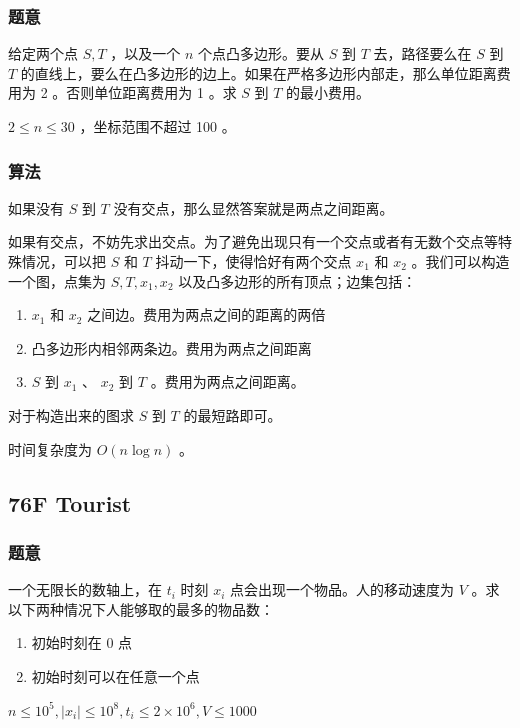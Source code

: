\documentclass[11pt]{article}
\begin{document}
\subsubsection{题意}
\label{sec-5-6-1}

    给定两个点 $S, T$ ，以及一个 $n$ 个点凸多边形。要从 $S$ 到 $T$ 去，路径要么在 $S$ 到 $T$ 的直线上，要么在凸多边形的边上。如果在严格多边形内部走，那么单位距离费用为 2 。否则单位距离费用为 1 。求 $S$ 到 $T$ 的最小费用。

    $2 \leq n \leq 30$ ，坐标范围不超过 100 。
\subsubsection{算法}
\label{sec-5-6-2}

    如果没有 $S$ 到 $T$ 没有交点，那么显然答案就是两点之间距离。

    如果有交点，不妨先求出交点。为了避免出现只有一个交点或者有无数个交点等特殊情况，可以把 $S$ 和 $T$ 抖动一下，使得恰好有两个交点 $x_1$ 和 $x_2$ 。我们可以构造一个图，点集为 $S, T, x_1, x_2$ 以及凸多边形的所有顶点；边集包括：
\begin{enumerate}
\item $x_1$ 和 $x_2$ 之间边。费用为两点之间的距离的两倍
\item 凸多边形内相邻两条边。费用为两点之间距离
\item $S$ 到 $x_1$ 、 $x_2$ 到 $T$ 。费用为两点之间距离。
\end{enumerate}

    对于构造出来的图求 $S$ 到 $T$ 的最短路即可。

    时间复杂度为 $O(n \log n)$ 。
\subsection{76F   Tourist}
\label{sec-5-7}
\subsubsection{题意}
\label{sec-5-7-1}

    一个无限长的数轴上，在 $t_i$ 时刻 $x_i$ 点会出现一个物品。人的移动速度为 $V$ 。求以下两种情况下人能够取的最多的物品数：
\begin{enumerate}
\item 初始时刻在 0 点
\item 初始时刻可以在任意一个点
\end{enumerate}

   $n \leq 10^5, |x_i| \leq 10^8, t_i \leq 2 \times 10^6, V \leq 1000$
\end{document}
